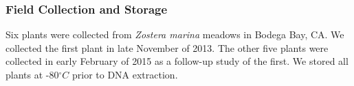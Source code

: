 
\subsubsection{\textbf{Field Collection and Storage}}

    Six plants were collected from \textit{Zostera marina} meadows in Bodega Bay, CA. We collected the first plant in late November of 2013. The other five plants were collected in early February of 2015 as a follow-up study of the first. We stored all plants at -80$^{\circ}C$ prior to DNA extraction. 
    
    
    
    
    